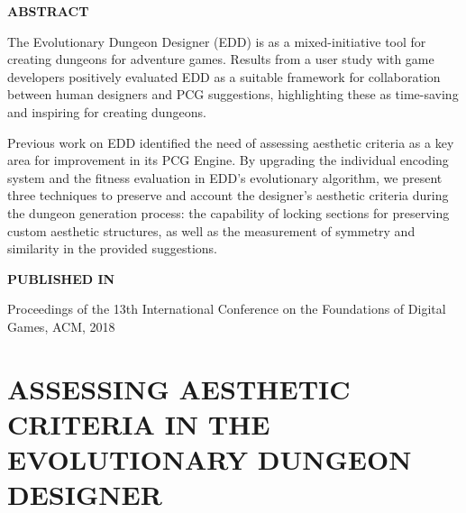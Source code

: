 



\normalfont
\textbf{\textsc{ABSTRACT}}

The Evolutionary Dungeon Designer (EDD) is as a mixed-initiative tool for creating dungeons for adventure games. Results from a user study with game developers positively evaluated EDD as a suitable framework for collaboration between human designers and PCG suggestions, highlighting these as time-saving and inspiring for creating dungeons.

Previous work on EDD identified the need of assessing aesthetic criteria as a key area for improvement in its PCG Engine. By upgrading the individual encoding system and the fitness evaluation in EDD's evolutionary algorithm, we present three techniques to preserve and account the designer's aesthetic criteria during the dungeon generation process: the capability of locking sections for preserving custom aesthetic structures, as well as the measurement of symmetry and similarity in the provided suggestions.

\textbf{\textsc{PUBLISHED IN}}

Proceedings of the 13th International Conference on the Foundations of Digital Games, ACM, 2018

\section*{ASSESSING AESTHETIC CRITERIA IN THE EVOLUTIONARY DUNGEON DESIGNER}

